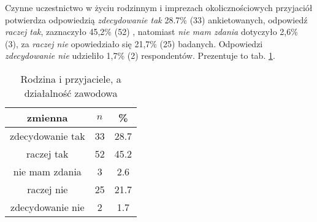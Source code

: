 
Czynne uczestnictwo w życiu rodzinnym i imprezach okolicznościowych przyjaciół potwierdza odpowiedzią \textit{zdecydowanie tak}  28.7\%   (33) ankietowanych, odpowiedź \textit{raczej tak},  zaznaczyło 45,2\% (52) , natomiast \textit{nie mam zdania} dotyczyło 2,6\% (3), za \textit{raczej nie} opowiedziało się  21,7\% (25) badanych. Odpowiedzi \textit{zdecydowanie nie} udzieliło 1,7\% (2) respondentów. Prezentuje to tab.  \ref{tab:Q24}.
\begin{table}[H]
\caption{Rodzina i przyjaciele, a działalność zawodowa}
\centering
\begin{tabular}{ | c | c | c |}
\hline
zmienna & $n$ & \% \\
\hline
zdecydowanie tak  &  33  & 28.7 \\
\hline
raczej tak  &  52  & 45.2\\
\hline
nie mam zdania  &  3  & 2.6\\
\hline
raczej nie  &  25  & 21.7\\
\hline
zdecydowanie nie  &  2  & 1.7 \\
\hline
\end{tabular}
\label{tab:Q24}
\end{table}
